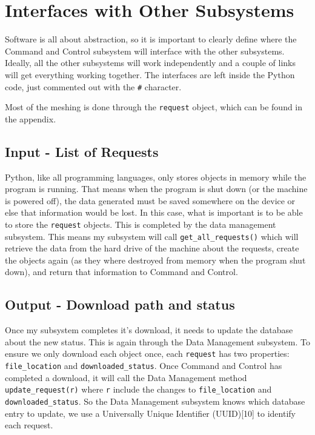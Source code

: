 \documentclass{article}
\begin{document}
\section{Interfaces with Other Subsystems}

Software is all about abstraction, so it is important to clearly
define where the Command and Control subsystem will interface with the other
subsystems. Ideally, all the other subsystems will work independently
and a couple of links will get everything working together. The
interfaces are left inside the Python code, just commented out with
the \texttt{\#} character.

Most of the meshing is done through the \texttt{request} object, which
can be found in the appendix.

\subsection{Input - List of Requests}

Python, like all programming languages, only stores objects in memory while the program is
running. That means when the program is shut down (or the machine is
powered off), the data generated must be saved somewhere on the
device or else that information would be lost. In this case, what is
important is to be able to store the \texttt{request} objects. This is
completed by the data management subsystem. This means my subsystem
will call \texttt{get\_all\_requests()} which will retrieve the data
from the hard drive of the machine
about the requests, create the objects again (as they where destroyed
from memory when the program shut down), and return that information
to Command and Control.

\subsection{Output - Download path and status}

Once my subsystem completes it's download, it needs to update the
database about the new status. This is again through the Data
Management subsystem. To ensure we only download each object once, each
\texttt{request} has two properties: \texttt{file\_location} and
\texttt{downloaded\_status}. Once Command and Control has completed a
download, it will call the Data Management method
\texttt{update\_request(r)} where \texttt{r} include the changes to
\texttt{file\_location} and \texttt{downloaded\_status}. So the
Data Management subsystem knows which database entry to update, we use
a Universally Unique Identifier (UUID)[10] to identify each
request.
\end{document}
